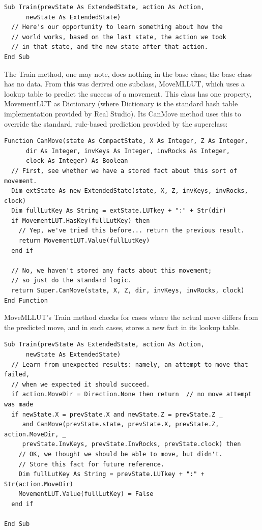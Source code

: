 \documentclass{article}
\begin{document}
\begin{lstlisting}
Sub Train(prevState As ExtendedState, action As Action,
      newState As ExtendedState)
  // Here's our opportunity to learn something about how the
  // world works, based on the last state, the action we took
  // in that state, and the new state after that action.
End Sub
\end{lstlisting}

The Train method, one may note, does nothing in the base class; the base class has no data.  From this was derived one subclass, MoveMLLUT, which uses a lookup table to predict the success of a movement.  This class has one property, MovementLUT as Dictionary (where Dictionary is the standard hash table implementation provided by Real Studio).  Its CanMove method uses this to override the standard, rule-based prediction provided by the superclass:

\begin{lstlisting}
Function CanMove(state As CompactState, X As Integer, Z As Integer,
      dir As Integer, invKeys As Integer, invRocks As Integer,
      clock As Integer) As Boolean
  // First, see whether we have a stored fact about this sort of movement.
  Dim extState As new ExtendedState(state, X, Z, invKeys, invRocks, clock)
  Dim fullLutKey As String = extState.LUTkey + ":" + Str(dir)
  if MovementLUT.HasKey(fullLutKey) then
    // Yep, we've tried this before... return the previous result.
    return MovementLUT.Value(fullLutKey)
  end if
  
  // No, we haven't stored any facts about this movement;
  // so just do the standard logic.
  return Super.CanMove(state, X, Z, dir, invKeys, invRocks, clock)
End Function
\end{lstlisting}

MoveMLLUT's Train method checks for cases where the actual move differs from the predicted move, and in such cases, stores a new fact in its lookup table.

\begin{lstlisting}
Sub Train(prevState As ExtendedState, action As Action,
      newState As ExtendedState)
  // Learn from unexpected results: namely, an attempt to move that failed,
  // when we expected it should succeed.
  if action.MoveDir = Direction.None then return  // no move attempt was made
  if newState.X = prevState.X and newState.Z = prevState.Z _
     and CanMove(prevState.state, prevState.X, prevState.Z, action.MoveDir, _
     prevState.InvKeys, prevState.InvRocks, prevState.clock) then
    // OK, we thought we should be able to move, but didn't.
    // Store this fact for future reference.
    Dim fullLutKey As String = prevState.LUTkey + ":" + Str(action.MoveDir)
    MovementLUT.Value(fullLutKey) = False
  end if
  
End Sub
\end{lstlisting}
\end{document}
